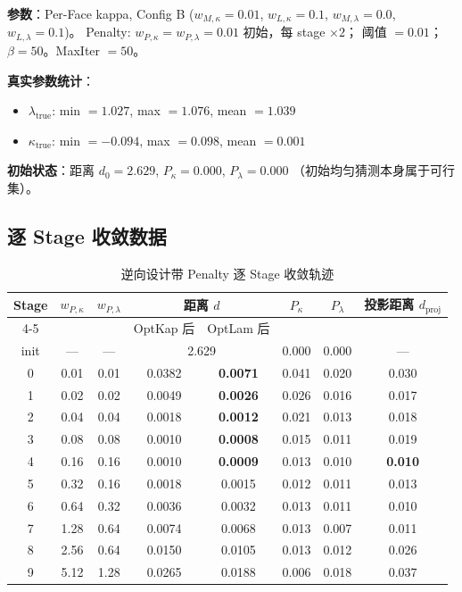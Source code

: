 \documentclass[12pt,a4paper]{article}
\begin{document}
\textbf{参数}：Per-Face kappa, Config B ($w_{M,\kappa} = 0.01$, $w_{L,\kappa} = 0.1$,
$w_{M,\lambda} = 0.0$, $w_{L,\lambda} = 0.1$)。
Penalty: $w_{P,\kappa} = w_{P,\lambda} = 0.01$ 初始，每 stage $\times 2$；
阈值 $= 0.01$；$\beta = 50$。MaxIter $= 50$。

\textbf{真实参数统计}：
\begin{itemize}
    \item $\lambda_\text{true}$: min $= 1.027$, max $= 1.076$, mean $= 1.039$
    \item $\kappa_\text{true}$: min $= -0.094$, max $= 0.098$, mean $= 0.001$
\end{itemize}

\textbf{初始状态}：距离 $d_0 = 2.629$, $P_\kappa = 0.000$, $P_\lambda = 0.000$
（初始均匀猜测本身属于可行集）。

\subsection{逐 Stage 收敛数据}

\begin{table}[H]
\centering
\caption{逆向设计带 Penalty 逐 Stage 收敛轨迹}
\label{tab:inv_penalty}
\begin{tabular}{cccccccc}
\toprule
Stage & $w_{P,\kappa}$ & $w_{P,\lambda}$ &
\multicolumn{2}{c}{距离 $d$} & $P_\kappa$ & $P_\lambda$ & 投影距离 $d_\text{proj}$ \\
\cmidrule(lr){4-5}
& & & OptKap 后 & OptLam 后 & & & \\
\midrule
init & --- & --- & \multicolumn{2}{c}{2.629} & 0.000 & 0.000 & --- \\
0 & 0.01 & 0.01 & 0.0382 & \textbf{0.0071} & 0.041 & 0.020 & 0.030 \\
1 & 0.02 & 0.02 & 0.0049 & \textbf{0.0026} & 0.026 & 0.016 & 0.017 \\
2 & 0.04 & 0.04 & 0.0018 & \textbf{0.0012} & 0.021 & 0.013 & 0.018 \\
3 & 0.08 & 0.08 & 0.0010 & \textbf{0.0008} & 0.015 & 0.011 & 0.019 \\
4 & 0.16 & 0.16 & 0.0010 & \textbf{0.0009} & 0.013 & \cellcolor{green!15}0.010 & \cellcolor{green!15}\textbf{0.010} \\
\midrule
5 & 0.32 & 0.16 & 0.0018 & 0.0015 & 0.012 & 0.011 & 0.013 \\
6 & 0.64 & 0.32 & 0.0036 & 0.0032 & 0.013 & 0.011 & 0.010 \\
7 & 1.28 & 0.64 & 0.0074 & 0.0068 & 0.013 & \cellcolor{green!15}0.007 & 0.011 \\
8 & 2.56 & 0.64 & 0.0150 & 0.0105 & 0.013 & 0.012 & 0.026 \\
9 & 5.12 & 1.28 & 0.0265 & 0.0188 & \cellcolor{green!15}0.006 & 0.018 & 0.037 \\
\bottomrule
\end{tabular}
\end{table}
\end{document}

